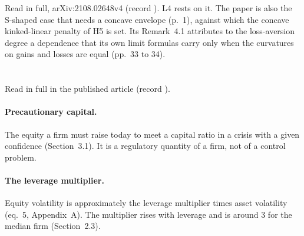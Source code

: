 \documentclass[11pt]{article}
\begin{document}
Read in full, arXiv:2108.02648v4 (record ). L4
rests on it. The paper is also the S-shaped case that needs a concave
envelope (p.~1), against which the concave kinked-linear penalty of H5 is
set. Its Remark~4.1 attributes to the loss-aversion degree a dependence that
its own limit formulas carry only when the curvatures on gains and losses are
equal (pp.~33 to 34).

\section{\citet{engle2018}}

Read in full in the published article (record
).

\paragraph{Precautionary capital.} The equity a firm must raise today to meet
a capital ratio in a crisis with a given confidence (Section~3.1). It is a
regulatory quantity of a firm, not of a control problem.

\paragraph{The leverage multiplier.} Equity volatility is approximately the
leverage multiplier times asset volatility (eq.~5, Appendix~A). The
multiplier rises with leverage and is around 3 for the median firm
(Section~2.3).



\end{document}
